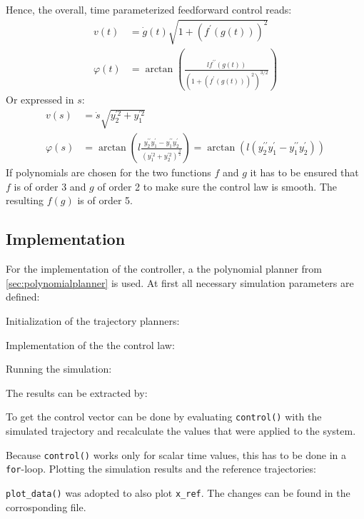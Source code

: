 \documentclass[a4paper,11pt,headings=standardclasses,parskip=half]{scrartcl}
\newcommand{\listcode}[3]{}
\newcommand{\listcodeffcontrol}[2]{\listcode{#1}{#2}{../sim/02_car_feedforward_control.py}}
\begin{document}
Hence, the overall, time parameterized feedforward control reads:
\begin{subequations}
\label{eq:controllaw}
\begin{align}
v(t) &= \dot g(t) \sqrt{1 + (f^\prime(g(t)))^2}\\
\varphi(t) &= \arctan\left(\frac{lf^{\prime\prime}(g(t))}{\left(1 + (f^\prime(g(t)))^2\right)^{3/2}}\right)
\end{align}
\end{subequations}
Or expressed in $s$:
\begin{subequations}
\label{eq:controllaw_2}
\begin{align}
v(s) &= \dot{s} \sqrt{y_2^{\prime2}+y_1^{\prime2}}\\
\varphi(s) &= \arctan\left(l \frac{y_2^{\prime\prime}y_1^\prime-y_1^{\prime\prime}y_2^\prime}{(y_1^{\prime2}+y_2^{\prime2})^{\frac{3}{2}}}\right) = \arctan\left(l (y_2^{\prime\prime}y_1^\prime-y_1^{\prime\prime}y_2^\prime)\right)
\end{align}
\end{subequations}
If polynomials are chosen for the two functions $f$ and $g$ it has to be ensured that $f$ is of order 3 and $g$ of order 2 to make sure the control law is smooth. The resulting $f(g)$ is of order 5.
\subsection{Implementation}
For the implementation of the controller, a the polynomial planner from \ref{sec:polynomialplanner} is used.
At first all necessary simulation parameters are defined:
\listcodeffcontrol{21}{27}
Initialization of the trajectory planners:
\listcodeffcontrol{30}{45}
Implementation of the the control law:
\listcodeffcontrol{70}{95}
Running the simulation:
\listcodeffcontrol{298}{298}
The results can be extracted by:
\listcodeffcontrol{299}{299}
To get the control vector can be done by evaluating \texttt{control()} with the simulated trajectory and recalculate the values that were applied to the system. 
\listcodeffcontrol{300}{302}
Because \texttt{control()} works only for scalar time values, this has to be done in a \texttt{for}-loop.
Plotting the simulation results and the reference trajectories:
\listcodeffcontrol{307}{318}
\texttt{plot\_data()} was adopted to also plot \texttt{x\_ref}. The changes can be found in the corrosponding file.
\end{document}
